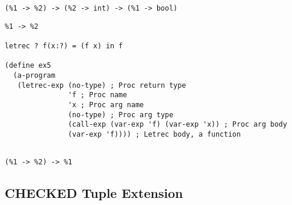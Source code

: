 \documentclass[../main.tex]{subfiles}
\begin{document}
\begin{lstlisting}
(%1 -> %2) -> (%2 -> int) -> (%1 -> bool)
\end{lstlisting}

\begin{lstlisting}
%1 -> %2

letrec ? f(x:?) = (f x) in f

(define ex5
  (a-program
   (letrec-exp (no-type) ; Proc return type
               'f ; Proc name
               'x ; Proc arg name
               (no-type) ; Proc arg type
               (call-exp (var-exp 'f) (var-exp 'x)) ; Proc arg body
               (var-exp 'f)))) ; Letrec body, a function


\end{lstlisting}

\begin{lstlisting}
(%1 -> %2) -> %1
\end{lstlisting}

\subsection{CHECKED Tuple Extension}
\end{document}
